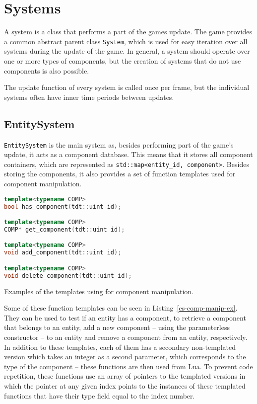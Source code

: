 \section{Systems}

A system is a class that performs a part of the games update. The game provides a common abstract parent class \texttt{System}, which is
used for easy iteration over all systems during the update of the game. In general, a system should operate over one or more types of
components, but the creation of systems that do not use components is also possible.

The update function of every system is called once per frame, but the individual systems often have inner time periods between updates.

\subsection{EntitySystem}

\texttt{EntitySystem} is the main system as, besides performing part of the game's update, it acts as a component database. This means that
it stores all component containers, which are represented as \texttt{std::map<entity\_id, component>}. Besides storing the components,
it also provides a set of function templates used for component manipulation.

\begin{listing}
    \centering
    \begin{lstlisting}[language=C++]
template<typename COMP>
bool has_component(tdt::uint id);

template<typename COMP>
COMP* get_component(tdt::uint id);

template<typename COMP>
void add_component(tdt::uint id);

template<typename COMP>
void delete_component(tdt::uint id);
    \end{lstlisting}
    \caption{Examples of the templates using for component manipulation.}
    \label{es-comp-manip-ex}
\end{listing}

Some of these function templates can be seen in Listing~\ref{es-comp-manip-ex}. They can be used to test if an entity has a component,
to retrieve a component
that belongs to an entity, add a new component -- using the parameterless constructor -- to an entity and remove a component from an entity,
respectively. In addition to these templates, each of them has a secondary non-templated version which takes an integer as a second parameter,
which corresponds to the type of the component -- these functions are then used from Lua.
To prevent code repetition, these functions use an array of pointers to the templated versions in which the pointer at any given index points
to the instances of these templated functions that have their type field equal to the index number.

